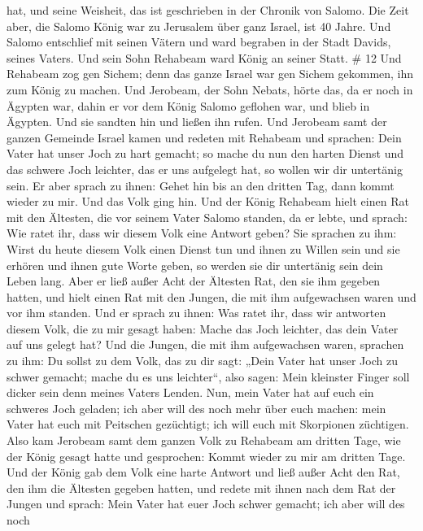 hat, und seine Weisheit, das ist geschrieben in der Chronik von Salomo.
 Die Zeit aber, die Salomo König war zu Jerusalem über ganz
Israel, ist 40 Jahre.  Und Salomo entschlief mit seinen
Vätern und ward begraben in der Stadt Davids, seines Vaters. Und sein
Sohn Rehabeam ward König an seiner Statt. \# 12  Und
Rehabeam zog gen Sichem; denn das ganze Israel war gen Sichem gekommen,
ihn zum König zu machen.  Und Jerobeam, der Sohn Nebats,
hörte das, da er noch in Ägypten war, dahin er vor dem König Salomo
geflohen war, und blieb in Ägypten.  Und sie sandten hin und
ließen ihn rufen. Und Jerobeam samt der ganzen Gemeinde Israel kamen und
redeten mit Rehabeam und sprachen:  Dein Vater hat unser
Joch zu hart gemacht; so mache du nun den harten Dienst und das schwere
Joch leichter, das er uns aufgelegt hat, so wollen wir dir untertänig
sein.  Er aber sprach zu ihnen: Gehet hin bis an den dritten
Tag, dann kommt wieder zu mir. Und das Volk ging hin.  Und
der König Rehabeam hielt einen Rat mit den Ältesten, die vor seinem
Vater Salomo standen, da er lebte, und sprach: Wie ratet ihr, dass wir
diesem Volk eine Antwort geben?  Sie sprachen zu ihm: Wirst
du heute diesem Volk einen Dienst tun und ihnen zu Willen sein und sie
erhören und ihnen gute Worte geben, so werden sie dir untertänig sein
dein Leben lang.  Aber er ließ außer Acht der Ältesten Rat,
den sie ihm gegeben hatten, und hielt einen Rat mit den Jungen, die mit
ihm aufgewachsen waren und vor ihm standen.  Und er sprach
zu ihnen: Was ratet ihr, dass wir antworten diesem Volk, die zu mir
gesagt haben: Mache das Joch leichter, das dein Vater auf uns gelegt
hat?  Und die Jungen, die mit ihm aufgewachsen waren,
sprachen zu ihm: Du sollst zu dem Volk, das zu dir sagt: „Dein Vater hat
unser Joch zu schwer gemacht; mache du es uns leichter``, also sagen:
Mein kleinster Finger soll dicker sein denn meines Vaters Lenden.
 Nun, mein Vater hat auf euch ein schweres Joch geladen;
ich aber will des noch mehr über euch machen: mein Vater hat euch mit
Peitschen gezüchtigt; ich will euch mit Skorpionen züchtigen.
 Also kam Jerobeam samt dem ganzen Volk zu Rehabeam am
dritten Tage, wie der König gesagt hatte und gesprochen: Kommt wieder zu
mir am dritten Tage.  Und der König gab dem Volk eine harte
Antwort und ließ außer Acht den Rat, den ihm die Ältesten gegeben
hatten,  und redete mit ihnen nach dem Rat der Jungen und
sprach: Mein Vater hat euer Joch schwer gemacht; ich aber will des noch

